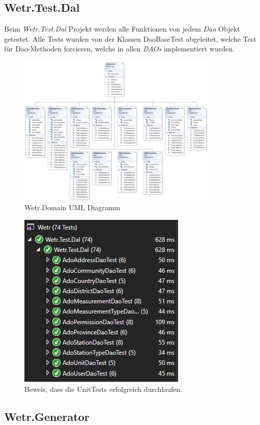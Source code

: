 \newpage
\subsection{Wetr.Test.Dal}
Beim \textit{Wetr.Test.Dal} Projekt werden alle Funktionen von jedem \textit{Dao} Objekt getestet. Alle Tests wurden von der Klassen DaoBaseTest abgeleitet, welche Test für Dao-Methoden forcieren, welche in allen \textit{DAOs} implementiert wurden. 

\begin{figure}[H]
\centering
\includegraphics[width=0.85\textwidth]{pictures/Wetr_Test_Dal.png}
\caption{Wetr.Domain UML Diagramm}
\label{fig:Wetr.Test.Dal}
\end{figure}
\raggedright

\begin{figure}[H]
\centering
\includegraphics[width=.4\textwidth]{pictures/green_tests.png}
\caption{Beweis, dass die UnitTests erfolgreich durchlaufen.}
\label{fig:Wetr.Test.Dal}
\end{figure}
\raggedright

\newpage
\subsection{Wetr.Generator}
\label{sec:generator}

